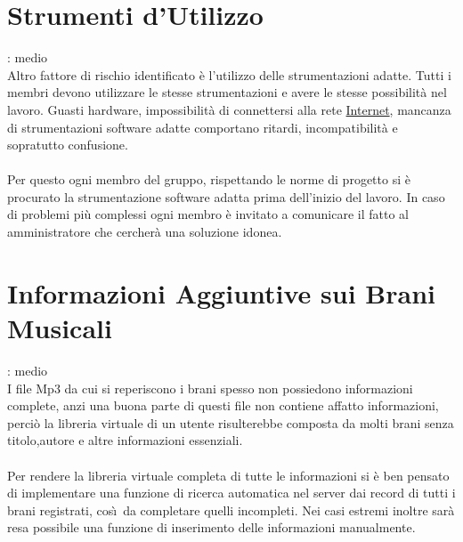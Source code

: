 \section{Strumenti d'Utilizzo}
: medio\\
Altro fattore di rischio identificato \`e l'utilizzo delle strumentazioni adatte. 
Tutti i membri devono utilizzare le stesse strumentazioni e avere le stesse possibilit\`a nel lavoro. 
Guasti hardware, impossibilit\`a di connettersi alla rete \underline{Internet},
mancanza di strumentazioni software adatte comportano ritardi, incompatibilit\`a e sopratutto confusione. \\
\\
Per questo ogni membro del gruppo, 
rispettando le norme di progetto si \`e procurato la strumentazione software
adatta prima dell'inizio del lavoro. In caso di problemi pi\`u complessi ogni
membro \`e invitato a comunicare il fatto al amministratore che cercher\`a una
soluzione idonea.

\section{Informazioni Aggiuntive sui Brani Musicali}
: medio\\
I file Mp3 da cui si reperiscono i brani spesso non possiedono informazioni
complete, anzi una buona parte di questi file non contiene affatto informazioni, perci\`o la libreria virtuale 
di un utente risulterebbe composta da molti brani senza titolo,autore e altre
informazioni essenziali.\\
\\
Per rendere la libreria virtuale completa di tutte le informazioni si \`e ben pensato di implementare una 
funzione di ricerca automatica nel server dai record di tutti i brani registrati, cos\`\i\ da completare 
quelli incompleti. Nei casi estremi inoltre sar\`a resa possibile una funzione
di inserimento delle informazioni manualmente.



